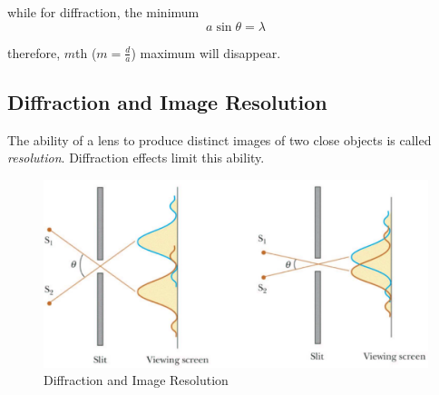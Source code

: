 \documentclass[UTF8]{book}
\begin{document}
while for diffraction, the minimum
\[a\sin \theta =\lambda \]

therefore, $m$th ($m=\frac{d}{a}$) maximum will disappear.


\subsection{Diffraction and Image Resolution}
The ability of a lens to produce distinct images of two close objects is called \emph{resolution}. Diffraction effects limit this ability.

\begin{figure}[H]
\centering
\label{fig:Diffraction and Image Resolution}
\includegraphics[scale=0.5]{Figure/28.PNG}
\caption{Diffraction and Image Resolution}
\end{figure}
\end{document}
